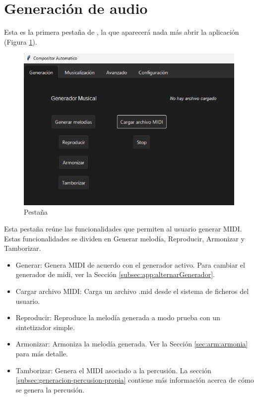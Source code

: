 \section{Generación de audio}
\label{sec:app:generacionAudio}
	Esta es la primera pestaña de \appName{}, la que aparecerá nada más abrir la aplicación (Figura \ref{fig:generationTab}).

\begin{figure}[h]
    \begin{center}
        \includegraphics[scale=0.75]{Imagenes/Bitmap/generationTab.png}
    \end{center}
    \caption{Pestaña \textit{\generationTabName{}}}
    \label{fig:generationTab}
\end{figure}

Esta pestaña reúne las funcionalidades que permiten al usuario generar MIDI. Estas funcionalidades se dividen en Generar melodía, Reproducir, Armonizar y Tamborizar.

\begin{itemize}
  \item Generar: Genera MIDI de acuerdo con el generador activo. Para cambiar el generador de midi, ver la Sección \ref{subsec:app:alternarGenerador}.
  \item Cargar archivo MIDI: Carga un archivo .mid desde el sistema de ficheros del usuario.
  \item Reproducir: Reproduce la melodía generada a modo prueba con un sintetizador simple.
  \item Armonizar: Armoniza la melodía generada. Ver la Sección \ref{sec:arm:armonia} para más detalle.
  \item Tamborizar: Genera el MIDI asociado a la percusión. La sección \ref{subsec:generacion-percusion-propia} contiene más información acerca de cómo se genera la percusión.
\end{itemize}

